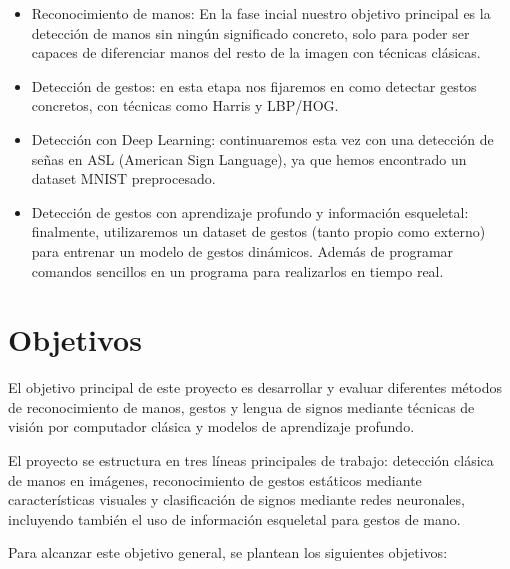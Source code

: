 \documentclass[10pt,a4paper,twocolumn,twoside]{article}
\begin{document}
\begin{itemize} %
\item	Reconocimiento de manos: En la fase incial nuestro objetivo principal es la detección de manos sin ningún significado concreto, solo para poder ser capaces de diferenciar manos del resto de la imagen con técnicas clásicas.
\item	Detección de gestos: en esta etapa nos fijaremos en como detectar gestos concretos, con técnicas como Harris y LBP/HOG.
\item	Detección con Deep Learning: continuaremos esta vez con una detección de señas en ASL (American Sign Language), ya que hemos encontrado un dataset MNIST preprocesado.
\item	Detección de gestos con aprendizaje profundo y información esqueletal: finalmente, utilizaremos un dataset de gestos (tanto propio como externo) para entrenar un modelo de gestos dinámicos. Además de programar comandos sencillos en un programa para realizarlos en tiempo real.
\end{itemize}

\section{Objetivos}

El objetivo principal de este proyecto es desarrollar y evaluar diferentes métodos de reconocimiento de manos, gestos y lengua de signos mediante técnicas de visión por computador clásica y modelos de aprendizaje profundo.

El proyecto se estructura en tres líneas principales de trabajo: detección clásica de manos en imágenes, reconocimiento de gestos estáticos mediante características visuales y clasificación de signos mediante redes neuronales, incluyendo también el uso de información esqueletal para gestos de mano.

Para alcanzar este objetivo general, se plantean los siguientes objetivos:
\end{document}
